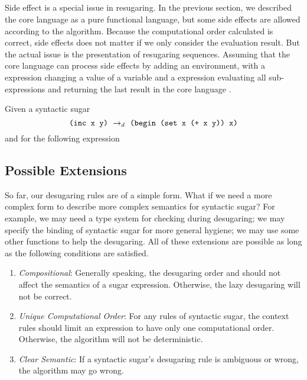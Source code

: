 \subsection{}


Side effect is a special issue in resugaring. In the previous section, we described the core language as a pure functional language, but some side effects are allowed according to the algorithm. Because the computational order calculated is correct, side effects does not matter if we only consider the evaluation result. But the actual issue is the presentation of resugaring sequences. Assuming that the core language can process side effects by adding an environment, with a  expression changing a value of a variable and a  expression evaluating all sub-expressions and returning the last result in the core language .

Given a syntactic sugar 
\[\texttt{(inc x y)} ~\rightarrow_d~ \texttt{(begin (set x (+ x y)) x)}\]
and for the following expression 
\todo{}


\subsection{Possible Extensions}

So far, our desugaring rules are of a simple form. What if we need a more complex form to describe more complex semantics for syntactic sugar? For example, we may need a type system for checking during desugaring; we may specify the binding of syntactic sugar for more general hygiene; we may use some other functions to help the desugaring. All of these extensions are possible as long as the following conditions are satisfied.
\begin{enumerate}
	\item \emph{Compositional}: Generally speaking, the desugaring order and should not affect the semantics of a sugar expression. Otherwise, the lazy desugaring will not be correct.
	\item \emph{Unique Computational Order}: For any rules of syntactic sugar, the context rules should limit an expression to have only one computational order. Otherwise, the algorithm  will not be deterministic.
	\item \emph{Clear Semantic}: If a syntactic sugar's desugaring rule is ambiguous or wrong, the algorithm  may go wrong.
\end{enumerate}

